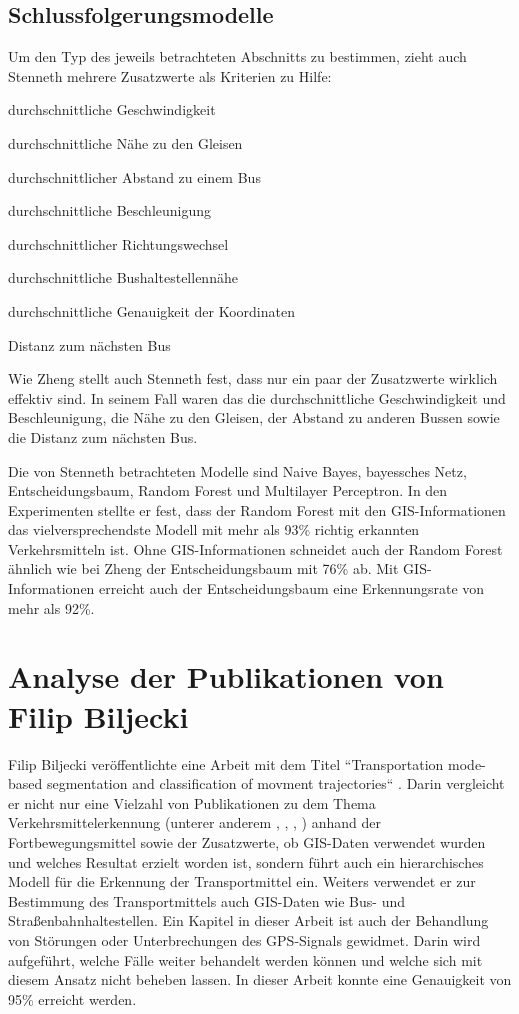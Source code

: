 \subsection{Schlussfolgerungsmodelle}
Um den Typ des jeweils betrachteten Abschnitts zu bestimmen, zieht auch Stenneth mehrere Zusatzwerte als Kriterien zu Hilfe:

\begin{pitemize}
\item durchschnittliche Geschwindigkeit
\item durchschnittliche Nähe zu den Gleisen
\item durchschnittlicher Abstand zu einem Bus
\item durchschnittliche Beschleunigung
\item durchschnittlicher Richtungswechsel
\item durchschnittliche Bushaltestellennähe
\item durchschnittliche Genauigkeit der Koordinaten
\item Distanz zum nächsten Bus
\end{pitemize}

Wie Zheng stellt auch Stenneth fest, dass nur ein paar der Zusatzwerte wirklich effektiv sind. In seinem Fall waren das die durchschnittliche Geschwindigkeit und Beschleunigung, die Nähe zu den Gleisen, der Abstand zu anderen Bussen sowie die Distanz zum nächsten Bus.

Die von Stenneth betrachteten Modelle sind Naive Bayes, bayessches Netz, Entscheidungsbaum, Random Forest und Multilayer Perceptron. In den Experimenten stellte er fest, dass der Random Forest mit den GIS-Informationen das vielversprechendste Modell mit mehr als 93\% richtig erkannten Verkehrsmitteln ist. Ohne GIS-Informationen schneidet auch der Random Forest ähnlich wie bei Zheng der Entscheidungsbaum mit 76\% ab. Mit GIS-Informationen erreicht auch der Entscheidungsbaum eine Erkennungsrate von mehr als 92\%. 

\section{Analyse der Publikationen von Filip Biljecki}
Filip Biljecki veröffentlichte eine Arbeit mit dem Titel ``Transportation mode-based segmentation and classification of movment trajectories`` \cite{biljecki_transportation_2013}. Darin vergleicht er nicht nur eine Vielzahl von Publikationen zu dem Thema Verkehrsmittelerkennung (unterer anderem \cite{schuessler_processing_2009}, \cite{zheng_understanding_2010}, \cite{reddy_using_2010}, \cite{gonzalez_automating_2010}) anhand der Fortbewegungsmittel sowie der Zusatzwerte, ob GIS-Daten verwendet wurden und welches Resultat erzielt worden ist, sondern führt auch ein hierarchisches Modell für die Erkennung der Transportmittel ein. Weiters verwendet er zur Bestimmung des Transportmittels auch GIS-Daten wie Bus- und Straßenbahnhaltestellen. Ein Kapitel in dieser Arbeit ist auch der Behandlung von Störungen oder Unterbrechungen des GPS-Signals gewidmet. Darin wird aufgeführt, welche Fälle weiter behandelt werden können und welche sich mit diesem Ansatz nicht beheben lassen. In dieser Arbeit konnte eine Genauigkeit von 95\% erreicht werden.

